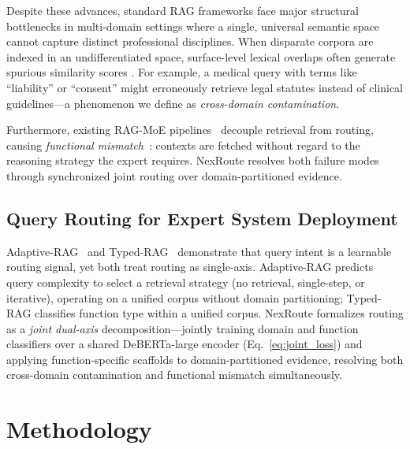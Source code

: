 \documentclass[a4paper,fleql]{cas-sc}
\begin{document}
Despite these advances, standard RAG frameworks face major structural bottlenecks in multi-domain settings where a single, universal semantic space cannot capture distinct professional disciplines. When disparate corpora are indexed in an undifferentiated space, surface-level lexical overlaps often generate spurious similarity scores \citep{wang2024multilingual}. For example, a medical query with terms like ``liability'' or ``consent'' might erroneously retrieve legal statutes instead of clinical guidelines—a phenomenon we define as \emph{cross-domain contamination}.

Furthermore, existing RAG-MoE pipelines~\citep{jeong2024adaptiverag,dou2024loramoe} decouple retrieval from routing, causing \emph{functional mismatch}~\citep{hu2024routerbench}: contexts are fetched without regard to the reasoning strategy the expert requires. NexRoute resolves both failure modes through synchronized joint routing over domain-partitioned evidence.

\subsection{Query Routing for Expert System Deployment}
Adaptive-RAG~\citep{jeong2024adaptiverag} and Typed-RAG~\citep{typedrag} demonstrate that query intent is a learnable routing signal, yet both treat routing as single-axis. Adaptive-RAG predicts query complexity to select a retrieval strategy (no retrieval, single-step, or iterative), operating on a unified corpus without domain partitioning; Typed-RAG classifies function type within a unified corpus. NexRoute formalizes routing as a \emph{joint dual-axis} decomposition---jointly training domain and function classifiers over a shared DeBERTa-large encoder (Eq.~\ref{eq:joint_loss}) and applying function-specific scaffolds to domain-partitioned evidence, resolving both cross-domain contamination and functional mismatch simultaneously.
\section{Methodology}
\label{sec:method}

\end{document}
